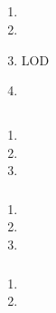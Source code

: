 \hypertarget{section-156}{%
\subsection{}\label{section-156}}

\important{}

\begin{enumerate}
\def\labelenumi{\arabic{enumi}.}
\item
  \important{}
\item
  \important{}
\item
  \important{}LOD
\item
  \important{}
\end{enumerate}

\hypertarget{section-157}{%
\subsection{}\label{section-157}}

\hypertarget{section-158}{%
\subsubsection{}\label{section-158}}

\begin{enumerate}
\def\labelenumi{\arabic{enumi}.}
\tightlist
\item
\item
\item
\end{enumerate}

\hypertarget{section-159}{%
\subsubsection{}\label{section-159}}

\begin{enumerate}
\def\labelenumi{\arabic{enumi}.}
\tightlist
\item
\item
\item
\end{enumerate}

\hypertarget{section-160}{%
\subsubsection{}\label{section-160}}

\begin{enumerate}
\def\labelenumi{\arabic{enumi}.}
\tightlist
\item
\item
\end{enumerate}

